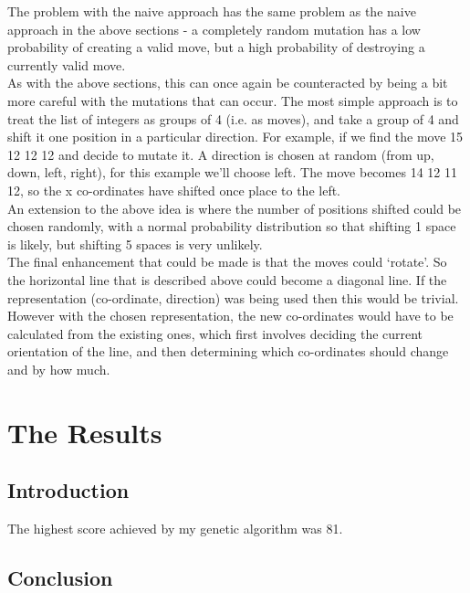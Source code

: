 \documentclass[]{report}
\begin{document}
The problem with the naive approach has the same problem as the naive approach in the above sections - a completely random mutation has a low probability of creating a valid move, but a high probability of destroying a currently valid move.\\

As with the above sections, this can once again be counteracted by being a bit more careful with the mutations that can occur. The most simple approach is to treat the list of integers as groups of 4 (i.e. as moves), and take a group of 4 and shift it one position in a particular direction. For example, if we find the move 15 12 12 12 and decide to mutate it. A direction is chosen at random (from up, down, left, right), for this example we'll choose left. The move becomes 14 12 11 12, so the x co-ordinates have shifted once place to the left.\\

An extension to the above idea is where the number of positions shifted could be chosen randomly, with a normal probability distribution so that shifting 1 space is likely, but shifting 5 spaces is very unlikely.\\

The final enhancement that could be made is that the moves could `rotate'. So the horizontal line that is described above could become a diagonal line. If the representation (co-ordinate, direction) was being used then this would be trivial. However with the chosen representation, the new co-ordinates would have to be calculated from the existing ones, which first involves deciding the current orientation of the line, and then determining which co-ordinates should change and by how much.


\chapter{The Results}

\section{Introduction}
The highest score achieved by my genetic algorithm was 81. 
\section{Conclusion}


\end{document}
